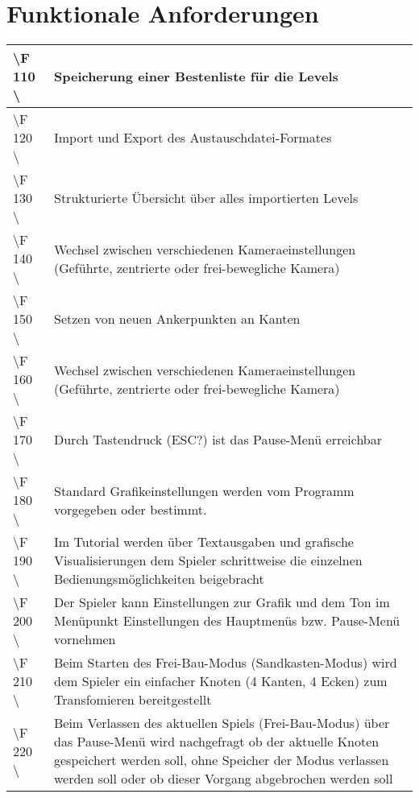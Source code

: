 \chapter{Funktionale Anforderungen}



\begin{tabular}{|p{}|p{}|}
\hline 
\textbackslash F 110  \textbackslash & Speicherung einer Bestenliste für die Levels \\ 
\hline 
\textbackslash F 120  \textbackslash  & Import und Export des Austauschdatei-Formates \\ 
\hline 
\textbackslash F 130  \textbackslash  & Strukturierte Übersicht über alles importierten Levels \\ 
\hline
\textbackslash F 140  \textbackslash  & Wechsel zwischen verschiedenen Kameraeinstellungen (Geführte, zentrierte oder frei-bewegliche Kamera)  \\ 
\hline
\textbackslash F 150  \textbackslash  & Setzen von neuen Ankerpunkten an Kanten \\ 
\hline
\textbackslash F 160  \textbackslash  & Wechsel zwischen verschiedenen Kameraeinstellungen (Geführte, zentrierte oder frei-bewegliche Kamera)  \\ 
\hline
\textbackslash F 170  \textbackslash  & Durch Tastendruck (ESC?) ist das Pause-Menü erreichbar\\ 
\hline
\textbackslash F 180  \textbackslash  & Standard Grafikeinstellungen werden vom Programm vorgegeben oder bestimmt.\\ 
\hline
\textbackslash F 190  \textbackslash  & Im Tutorial werden über Textausgaben und grafische Visualisierungen dem Spieler schrittweise die einzelnen Bedienungsmöglichkeiten beigebracht  \\
\hline
\textbackslash F 200  \textbackslash  & Der Spieler kann Einstellungen zur Grafik und dem Ton im Menüpunkt Einstellungen des Hauptmenüs bzw. Pause-Menü vornehmen\\
\hline
\textbackslash F 210  \textbackslash  & Beim Starten des Frei-Bau-Modus (Sandkasten-Modus) wird dem Spieler ein einfacher Knoten (4 Kanten, 4 Ecken) zum Transfomieren bereitgestellt \\
\hline
\textbackslash F 220  \textbackslash  & Beim Verlassen des aktuellen Spiels (Frei-Bau-Modus) über das Pause-Menü wird nachgefragt ob der aktuelle Knoten gespeichert werden soll, ohne Speicher der Modus verlassen werden soll oder ob dieser Vorgang abgebrochen werden soll\\

\end{tabular}
